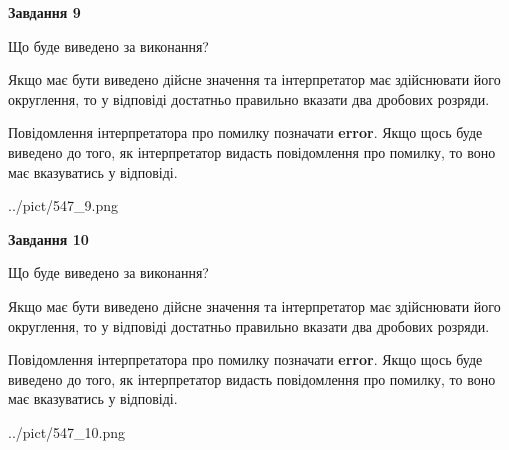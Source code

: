 \documentclass[12pt, ukrainian]{article}
\begin{document}
{\begin {Large}
{\begin {center}\textbf{Завдання 9}\end {center}}\par
Що буде виведено за виконання? \par

Якщо має бути виведено дійсне значення та інтерпретатор має здійснювати його округлення, 
то у відповіді достатньо правильно вказати два дробових розряди.

Повідомлення інтерпретатора про помилку позначати \textbf{error}.
Якщо щось буде виведено до того, як інтерпретатор видасть повідомлення про помилку, 
то воно має вказуватись у відповіді. \par

\begin{center}
	{../pict/547_9.png}
\end{center}
\newpage

{\begin {center}\textbf{Завдання 10}\end {center}}\par
Що буде виведено за виконання? \par

Якщо має бути виведено дійсне значення та інтерпретатор має здійснювати його округлення, 
то у відповіді достатньо правильно вказати два дробових розряди.

Повідомлення інтерпретатора про помилку позначати \textbf{error}.
Якщо щось буде виведено до того, як інтерпретатор видасть повідомлення про помилку, 
то воно має вказуватись у відповіді. \par

\begin{center}
	{../pict/547_10.png}
\end{center}
\newpage

\end {Large}}
\end{document}
